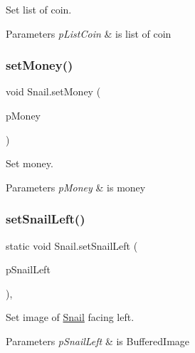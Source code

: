 Set list of coin.


\begin{DoxyParams}{Parameters}
{\em p\+List\+Coin} & is list of coin \\
\hline
\end{DoxyParams}
\mbox{\label{class_snail_a99cf307667441615ed79de2fd4ba5fe5}} 
\subsubsection{\texorpdfstring{set\+Money()}{setMoney()}}
{\footnotesize\ttfamily void Snail.\+set\+Money (\begin{DoxyParamCaption}\item[{final \mbox{\hyperlink{class_node}{Node}}$<$ Integer $>$}]{p\+Money }\end{DoxyParamCaption})\hspace{0.3cm}{\ttfamily [inline]}}

Set money.


\begin{DoxyParams}{Parameters}
{\em p\+Money} & is money \\
\hline
\end{DoxyParams}
\mbox{\label{class_snail_a90cd994cbdd5daae66bade7702472dac}} 
\subsubsection{\texorpdfstring{set\+Snail\+Left()}{setSnailLeft()}}
{\footnotesize\ttfamily static void Snail.\+set\+Snail\+Left (\begin{DoxyParamCaption}\item[{final Buffered\+Image}]{p\+Snail\+Left }\end{DoxyParamCaption})\hspace{0.3cm}{\ttfamily [inline]}, {\ttfamily [static]}}

Set image of \mbox{\hyperlink{class_snail}{Snail}} facing left.


\begin{DoxyParams}{Parameters}
{\em p\+Snail\+Left} & is Buffered\+Image \\
\hline
\end{DoxyParams}
\mbox{\label{class_snail_a604a57abe628e6f708d61365630fdc9e}} 
